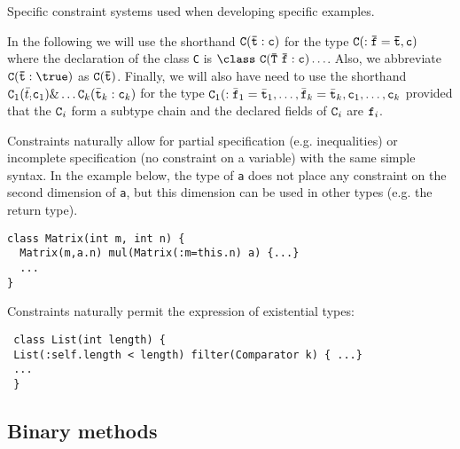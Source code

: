 %
%
%
%
%
%

Specific constraint systems used when developing specific
examples.

In the following we will use the shorthand $\tt C(\bar{t}:c)$ for the
type $\tt C(:\bar{f}=\bar{t},c)$ where the declaration of the class
{\tt C} is $\tt \class\ C(\bar{\tt T}\ \bar{\tt f}:c)\ldots$.  Also,
we abbreviate $\tt C(\bar{t}:\true)$ as $\tt C(\bar{t})$.  Finally, we
will also have need to use the shorthand ${\tt C}_1(\bar{t}_:{\tt
c}_1)\& \ldots {\tt C}_k(\bar{\tt t}_k:{\tt c}_k)$ for the type
${\tt C}_1(:\bar{\tt f}_1=\bar{\tt t}_1, \ldots, \bar{\tt
f}_k=\bar{\tt t}_k,{\tt c}_1,\ldots,{\tt c}_k$ 
provided that the ${\tt C}_i$ form a subtype chain
and the declared fields of ${\tt C}_i$ are ${\tt f}_i$.

Constraints naturally allow for partial specification
(e.g. inequalities) or incomplete specification (no constraint on a
variable) with the same simple syntax. In the example below,
the type of {\tt a} does not place any constraint on the second
dimension of {\tt a}, but this dimension can be used in other
types (e.g.{} the return type).

{\footnotesize
\begin{verbatim}
class Matrix(int m, int n) {
  Matrix(m,a.n) mul(Matrix(:m=this.n) a) {...}
  ...
}
\end{verbatim}}

Constraints naturally permit the expression of existential types:

{\footnotesize
\begin{verbatim}
 class List(int length) { 
 List(:self.length < length) filter(Comparator k) { ...} 
 ...
 }
\end{verbatim}}


\subsection{Binary methods}


